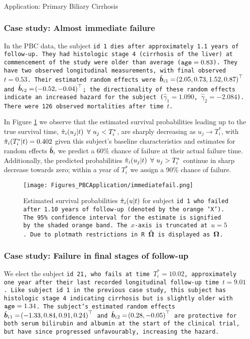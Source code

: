 \begin{chapter}{\label{cha:app-PBC}Application: Primary Biliary Cirrhosis}
  \rmtoc
  \subsubsection{Case study: Almost immediate failure}
  In the PBC data, the subject \tt{id} 1 dies after approximately 1.1 years of follow-up. They had \tt{histologic} stage 4 (\ie cirrhosis of the liver) at commencement of the study were older than average ($\tt{age}=0.83$). They have two observed longitudinal measurements, with final observed $t = 0.53$. Their estimated random effects were $\hb{_1}=\lb2.05,0.73,1.52,0.87\rb^\top$ and $\hb{_2}=\lb-0.52,-0.04\rb^\top$; the directionality of these random effects indicate an increased hazard for the subject ($\hat{\gamma}_1=1.090$, $\hat{\gamma}_2=-2.084$). There were 126 observed mortalities after time $t$.

  In Figure \ref{fig:pbc-final-model-dynpreds-immediatefail} we observe that the estimated survival probabilities leading up to the true survival time, $\hat{\pi}_i\lb u_j|t\rb\ \forall\ u_j<T_i^*$, are sharply decreasing as  $u_j\rightarrow T_i^*$, with $\hat{\pi}_i\lb T_i^*|t\rb=0.402$ \ie given this subject's baseline characteristics and estimates for random effects $\hb$ we predict a 60\% chance of failure at their actual failure time. Additionally, the predicted probabilities $\hat{\pi}_i\lb u_j|t\rb\ \forall\ u_j>T_i^*$ continue in sharp decrease towards zero; within a year of $T_i^*$ we assign a 90\% chance of failure.

  \begin{figure}[ht]
      \centering
      \texttt{[image: Figures\_PBCApplication/immediatefail.png]}
      \caption{Estimated survival probabilities $\hat{\pi}_i\lb u|t\rb$ for subject \tt{id} 1 who failed after 1.10 years of follow-up (denoted by the orange `X'). The 95\% confidence interval for the estimate is signified by the shaded orange band. The $x$-axis is truncated at $u=5$. Due to \tt{plotmath} restrictions in \tt{R} $\hbO$ is displayed as $\bO$.}
      \label{fig:pbc-final-model-dynpreds-immediatefail}
  \end{figure}

  \subsubsection{Case study: Failure in final stages of follow-up}
  We elect the subject \tt{id} 21, who fails at time $T_i^*=10.02$, approximately one year after their last recorded longitudinal follow-up time $t=9.01$. Like subject \tt{id} 1 in the previous case study, this subject has \tt{histologic} stage 4 indicating cirrhosis but is slightly older with $\tt{age}=1.34$. The subject's estimated random effects $\hb{_1}=\lb-1.33,0.84,0.91,0.24\rb^\top$ and $\hb{_2}=\lb0.28,-0.05\rb^\top$ are protective for both serum bilirubin and albumin at the start of the clinical trial, but have since progressed unfavourably, increasing the hazard.


\end{chapter}
